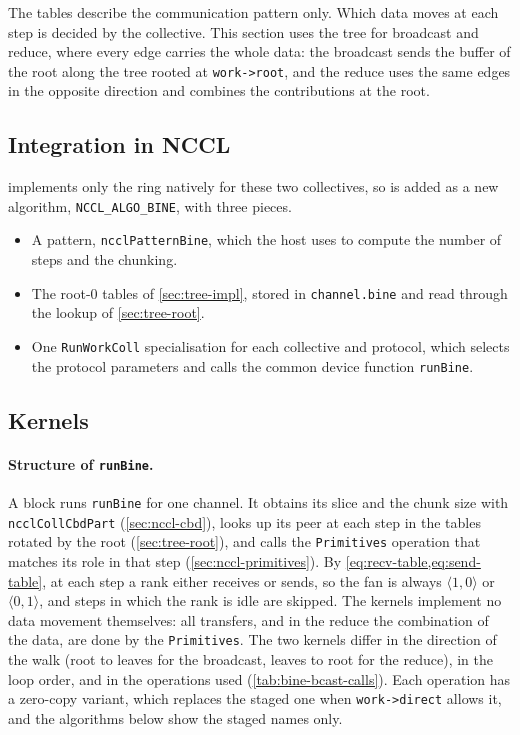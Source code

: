 The tables describe the communication pattern only. Which data moves at each step is decided by the collective.
This section uses the \bine{} tree for broadcast and reduce, where every edge carries the whole data: the broadcast sends the buffer of the root along the tree rooted at \texttt{work->root}, and the reduce uses the same edges in the opposite direction and combines the contributions at the root.

\subsection{Integration in NCCL}\label{sec:tree-integration}

\nccl{} implements only the ring natively for these two collectives, so \bine{} is added as a new algorithm, \texttt{NCCL\_ALGO\_BINE}, with three pieces.
\begin{itemize}
  \item A pattern, \texttt{ncclPatternBine}, which the host uses to compute the number of steps and the chunking.
  \item The root-$0$ tables of \cref{sec:tree-impl}, stored in \texttt{channel.bine} and read through the lookup of \cref{sec:tree-root}.
  \item One \texttt{RunWorkColl} specialisation for each collective and protocol, which selects the protocol parameters and calls the common device function \texttt{runBine}.
\end{itemize}

\subsection{Kernels}

\paragraph{Structure of \texttt{runBine}.}
A block runs \texttt{runBine} for one channel.
It obtains its slice and the chunk size with \texttt{ncclCollCbdPart} (\cref{sec:nccl-cbd}), looks up its peer at each step in the tables rotated by the root (\cref{sec:tree-root}), and calls the \texttt{Primitives} operation that matches its role in that step (\cref{sec:nccl-primitives}).
By \cref{eq:recv-table,eq:send-table}, at each step a rank either receives or sends, so the fan is always $\langle1,0\rangle$ or $\langle0,1\rangle$, and steps in which the rank is idle are skipped.
The kernels implement no data movement themselves: all transfers, and in the reduce the combination of the data, are done by the \texttt{Primitives}.
The two kernels differ in the direction of the walk (root to leaves for the broadcast, leaves to root for the reduce), in the loop order, and in the operations used (\cref{tab:bine-bcast-calls}).
Each operation has a zero-copy variant, which replaces the staged one when \texttt{work->direct} allows it, and the algorithms below show the staged names only.

